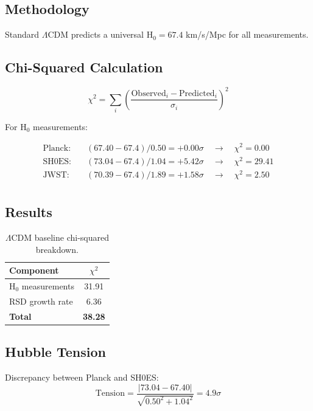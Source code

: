 \documentclass[11pt,letterpaper]{article}
\begin{document}
\subsection{Methodology}

Standard $\Lambda$CDM predicts a universal H$_0 = 67.4$ km/s/Mpc for all measurements.

\subsection{Chi-Squared Calculation}

\begin{equation}
\chi^2 = \sum_i \left(\frac{\text{Observed}_i - \text{Predicted}_i}{\sigma_i}\right)^2
\end{equation}

\noindent For H$_0$ measurements:

\begin{align*}
\text{Planck:} \quad & (67.40 - 67.4)/0.50 = +0.00\sigma \quad \rightarrow \quad \chi^2 = 0.00 \\
\text{SH0ES:} \quad & (73.04 - 67.4)/1.04 = +5.42\sigma \quad \rightarrow \quad \chi^2 = 29.41 \\
\text{JWST:} \quad & (70.39 - 67.4)/1.89 = +1.58\sigma \quad \rightarrow \quad \chi^2 = 2.50 \\
\end{align*}

\subsection{Results}

\begin{table}[h]
\centering
\begin{tabular}{lc}
\toprule
Component & $\chi^2$ \\
\midrule
H$_0$ measurements & 31.91 \\
RSD growth rate & 6.36 \\
\midrule
\textbf{Total} & \textbf{38.28} \\
\bottomrule
\end{tabular}
\caption{$\Lambda$CDM baseline chi-squared breakdown.}
\end{table}

\subsection{Hubble Tension}

Discrepancy between Planck and SH0ES:
\begin{equation}
\text{Tension} = \frac{|73.04 - 67.40|}{\sqrt{0.50^2 + 1.04^2}} = 4.9\sigma
\end{equation}
\end{document}

